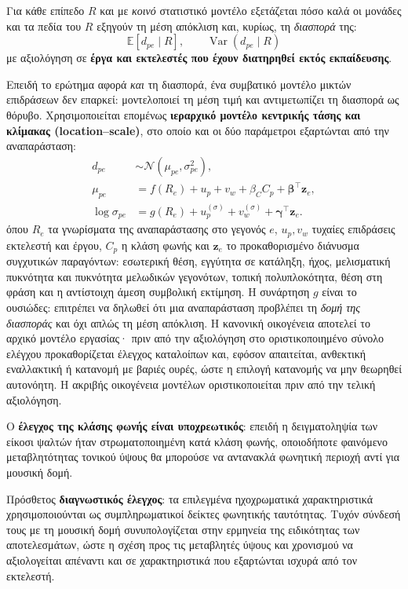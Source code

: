 \documentclass[11pt,a4paper]{article}
\begin{document}
Για κάθε επίπεδο \(R\) και με \emph{κοινό} στατιστικό μοντέλο εξετάζεται πόσο καλά οι μονάδες και τα πεδία του \(R\) εξηγούν τη μέση απόκλιση και, κυρίως, τη \emph{διασπορά} της:
\[
\mathbb{E}[d_{pe}\mid R],\qquad \operatorname{Var}(d_{pe}\mid R)
\]
με αξιολόγηση σε \textbf{έργα και εκτελεστές που έχουν διατηρηθεί εκτός εκπαίδευσης}.

Επειδή το ερώτημα αφορά \emph{και} τη διασπορά, ένα συμβατικό μοντέλο μικτών επιδράσεων δεν επαρκεί: μοντελοποιεί τη μέση τιμή και αντιμετωπίζει τη διασπορά ως θόρυβο. Χρησιμοποιείται επομένως \textbf{ιεραρχικό μοντέλο κεντρικής τάσης και κλίμακας (location--scale)}, στο οποίο και οι δύο παράμετροι εξαρτώνται από την αναπαράσταση:
\[
\begin{aligned}
d_{pe}&\sim\mathcal{N}(\mu_{pe},\sigma^2_{pe}),\\
\mu_{pe}&=f(R_e)+u_p+v_w+\beta_C C_p+\boldsymbol\beta^{\top}\mathbf z_e,\\
\log\sigma_{pe}&=g(R_e)+u^{(\sigma)}_p+v^{(\sigma)}_w+\boldsymbol\gamma^{\top}\mathbf z_e.
\end{aligned}
\]
όπου \(R_e\) τα γνωρίσματα της αναπαράστασης στο γεγονός \(e\), \(u_p,v_w\) τυχαίες επιδράσεις εκτελεστή και έργου, \(C_p\) η κλάση φωνής και \(\mathbf z_e\) το προκαθορισμένο διάνυσμα συγχυτικών παραγόντων: εσωτερική θέση, εγγύτητα σε κατάληξη, ήχος, μελισματική πυκνότητα και πυκνότητα μελωδικών γεγονότων, τοπική πολυπλοκότητα, θέση στη φράση και η αντίστοιχη άμεση συμβολική εκτίμηση. Η συνάρτηση \(g\) είναι το ουσιώδες: επιτρέπει να δηλωθεί ότι μια αναπαράσταση προβλέπει τη \emph{δομή της διασποράς} και όχι απλώς τη μέση απόκλιση. Η κανονική οικογένεια αποτελεί το αρχικό μοντέλο εργασίας· πριν από την αξιολόγηση στο οριστικοποιημένο σύνολο ελέγχου προκαθορίζεται έλεγχος καταλοίπων και, εφόσον απαιτείται, ανθεκτική εναλλακτική ή κατανομή με βαριές ουρές, ώστε η επιλογή κατανομής να μην θεωρηθεί αυτονόητη. Η ακριβής οικογένεια μοντέλων οριστικοποιείται πριν από την τελική αξιολόγηση.

Ο \textbf{έλεγχος της κλάσης φωνής είναι υποχρεωτικός}: επειδή η δειγματοληψία των είκοσι ψαλτών ήταν στρωματοποιημένη κατά κλάση φωνής, οποιοδήποτε φαινόμενο μεταβλητότητας τονικού ύψους θα μπορούσε να αντανακλά φωνητική περιοχή αντί για μουσική δομή.

Πρόσθετος \textbf{διαγνωστικός έλεγχος}: τα επιλεγμένα ηχοχρωματικά χαρακτηριστικά χρησιμοποιούνται ως συμπληρωματικοί δείκτες φωνητικής ταυτότητας. Τυχόν σύνδεσή τους με τη μουσική δομή συνυπολογίζεται στην ερμηνεία της ειδικότητας των αποτελεσμάτων, ώστε η σχέση προς τις μεταβλητές ύψους και χρονισμού να αξιολογείται απέναντι και σε χαρακτηριστικά που εξαρτώνται ισχυρά από τον εκτελεστή.
\end{document}
